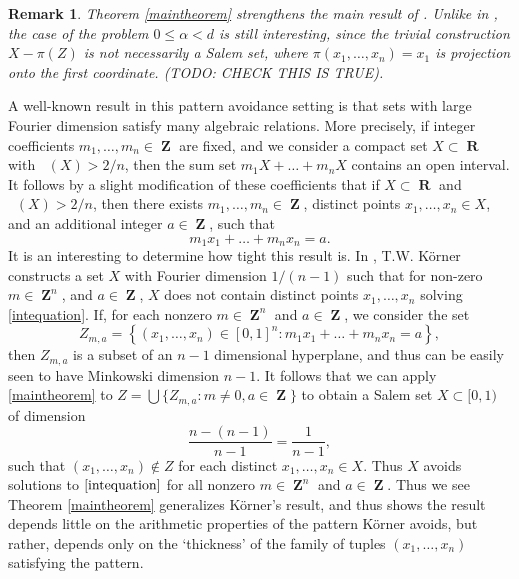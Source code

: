 \documentclass[12pt,reqno]{article}
\DeclareMathOperator{\fordim}{\dim_{\mathbf{F}}}
\DeclareMathOperator{\RR}{\mathbf{R}}
\DeclareMathOperator{\ZZ}{\mathbf{Z}}
\newtheorem*{remark}{Remark}
\begin{document}
\begin{remark}
    Theorem \ref{maintheorem} strengthens the main result of \cite{OurPaper}. Unlike in \cite{OurPaper}, the case of the problem $0 \leq \alpha < d$ is still interesting, since the trivial construction $X - \pi(Z)$ is not necessarily a Salem set, where $\pi(x_1, \dots, x_n) = x_1$ is projection onto the first coordinate. (TODO: CHECK THIS IS TRUE).
\end{remark}

A well-known result in this pattern avoidance setting is that sets with large Fourier dimension satisfy many algebraic relations. More precisely, if integer coefficients $m_1, \dots, m_n \in \ZZ$ are fixed, and we consider a compact set $X \subset \RR$ with $\fordim(X) > 2/n$, then the sum set $m_1 X + \dots + m_n X$ contains an open interval. It follows by a slight modification of these coefficients that if $X \subset \RR$ and $\fordim(X) > 2/n$, then there exists $m_1, \dots, m_n \in \ZZ$, distinct points $x_1, \dots, x_n \in X$, and an additional integer $a \in \ZZ$, such that
%
\begin{equation} \label{intequation}
    m_1 x_1 + \dots + m_n x_n = a.
\end{equation}
%
It is an interesting to determine how tight this result is. In \cite{Korner2}, T.W. K\"{o}rner constructs a set $X$ with Fourier dimension $1/(n-1)$ such that for non-zero $m \in \ZZ^n$, and $a \in \ZZ$, $X$ does not contain distinct points $x_1, \dots, x_n$ solving \eqref{intequation}. If, for each nonzero $m \in \ZZ^n$ and $a \in \ZZ$, we consider the set
%
\[ Z_{m,a} = \left\{ (x_1, \dots, x_n) \in [0,1]^n : m_1x_1 + \dots + m_n x_n = a \right\}, \]
%
then $Z_{m,a}$ is a subset of an $n-1$ dimensional hyperplane, and thus can be easily seen to have Minkowski dimension $n-1$. It follows that we can apply \ref{maintheorem} to $Z = \bigcup \{ Z_{m,a} : m \neq 0, a \in \ZZ \}$ to obtain a Salem set $X \subset [0,1)$ of dimension
%
\[ \frac{n - (n-1)}{n - 1} = \frac{1}{n-1}, \]
%
such that $(x_1, \dots, x_n) \not \in Z$ for each distinct $x_1, \dots, x_n \in X$. Thus $X$ avoids solutions to $\eqref{intequation}$ for all nonzero $m \in \ZZ^n$ and $a \in \ZZ$. Thus we see Theorem \ref{maintheorem} generalizes K\"{o}rner's result, and thus shows the result depends little on the arithmetic properties of the pattern K\"{o}rner avoids, but rather, depends only on the `thickness' of the family of tuples $(x_1, \dots, x_n)$ satisfying the pattern.
\end{document}
